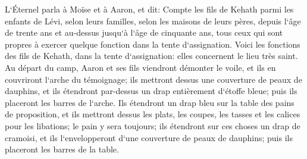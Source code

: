 \verse L`Éternel parla à Moïse et à Aaron, et dit: 
\verse Compte les fils de Kehath parmi les enfants de Lévi, selon leurs familles, selon les maisons de leurs pères, 
\verse depuis l`âge de trente ans et au-dessus jusqu`à l`âge de cinquante ans, tous ceux qui sont propres à exercer quelque fonction dans la tente d`assignation. 
\verse Voici les fonctions des fils de Kehath, dans la tente d`assignation: elles concernent le lieu très saint. 
\verse Au départ du camp, Aaron et ses fils viendront démonter le voile, et ils en couvriront l`arche du témoignage; 
\verse ils mettront dessus une couverture de peaux de dauphins, et ils étendront par-dessus un drap entièrement d`étoffe bleue; puis ils placeront les barres de l`arche. 
\verse Ils étendront un drap bleu sur la table des pains de proposition, et ils mettront dessus les plats, les coupes, les tasses et les calices pour les libations; le pain y sera toujours; 
\verse ils étendront sur ces choses un drap de cramoisi, et ils l`envelopperont d`une couverture de peaux de dauphins; puis ils placeront les barres de la table. 

